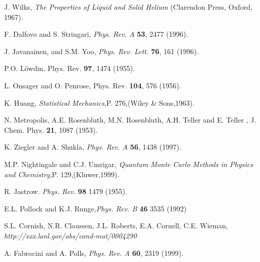 \documentclass[aps,pra,twocolumn,groupedaddress]{revtex4}
\begin{document}
\begin{thebibliography}{999}
J. Wilks, {\em The Properties of Liquid and Solid Helium} (Clarendon Press, Oxford, 1967).

F. Dalfovo and S. Stringari, {\em Phys. Rev. A} {\bf 53}, 2477 (1996).

J. Javanainen, and S.M. Yoo, {\em Phys. Rev. Lett.} {\bf 76}, 161 (1996).

P.O. L\"owdin, Phys. Rev. {\bf 97}, 1474 (1955).

L. Onsager and O. Penrose, Phys. Rev. {\bf 104}, 576 (1956).

K. Huang, {\em Statistical Mechanics},P. 276,(Wiley \& Sons,1963).

N. Metropolis, A.E. Rosenbluth, M.N. Rosenbluth, 
A.H. Teller and E. Teller , J. Chem. Phys. {\bf 21}, 1087 (1953).

K. Ziegler and A. Shukla, {\em Phys. Rev. A} {\bf 56}, 1438 (1997). 

M.P. Nightingale and C.J. Umrigar, 
{\em Quantum Monte Carlo Methods in Physics and Chemistry},P. 129,(Kluwer,1999).

R. Jastrow. {\em Phys. Rev.} {\bf 98} 1479 (1955).

E.L. Pollock and  K.J. Runge,{\em Phys. Rev. B} {\bf 46} 3535 (1992)

S.L. Cornish, N.R. Claussen, J.L. Roberts, E.A. Cornell, C.E. Wieman, {\em http://xxx.lanl.gov/abs/cond-mat/0004290}


A. Fabrocini and A. Polls, {\em Phys. Rev. A} {\bf 60}, 2319 (1999).

\end{thebibliography}
\end{document}
